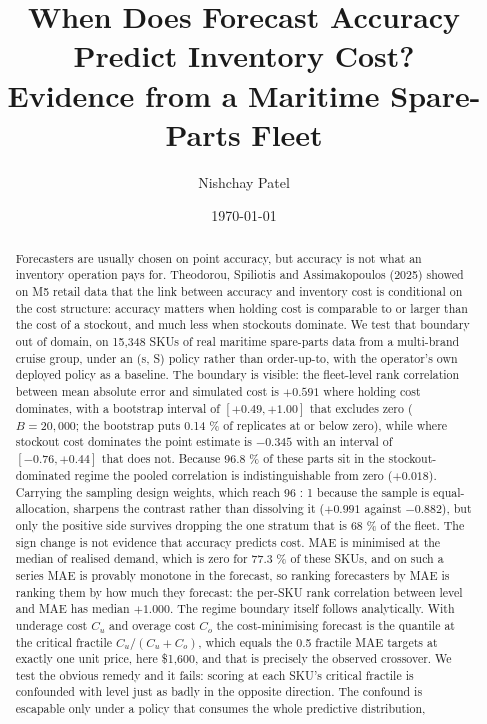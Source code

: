 \documentclass[11pt]{article}
\title{When Does Forecast Accuracy Predict Inventory Cost?\\[2pt]
\large Evidence from a Maritime Spare-Parts Fleet}
\author{Nishchay Patel}
\date{\today}
\begin{document}
\maketitle

\begin{abstract}
Forecasters are usually chosen on point accuracy, but accuracy is not what an
inventory operation pays for. Theodorou, Spiliotis and Assimakopoulos (2025)
showed on M5 retail data that the link between accuracy and inventory cost is
conditional on the cost structure: accuracy matters when holding cost is
comparable to or larger than the cost of a stockout, and much less when
stockouts dominate. We test that boundary out of domain, on 15{,}348 SKUs of
real maritime spare-parts data from a multi-brand cruise group, under an
(s, S) policy rather than order-up-to, with the operator's own deployed policy
as a baseline. The boundary is visible: the fleet-level rank correlation
between mean absolute error and simulated cost is $+0.591$ where holding cost
dominates, with a bootstrap interval of $[+0.49, +1.00]$ that excludes zero
($B = 20{,}000$; the bootstrap puts 0.14 \% of replicates at or below zero),
while where stockout cost dominates the point estimate is $-0.345$ with an
interval of $[-0.76, +0.44]$ that does not. Because 96.8 \% of these parts sit
in the stockout-dominated regime the pooled correlation is indistinguishable
from zero ($+0.018$). Carrying the sampling design weights, which reach 96 : 1
because the sample is equal-allocation, sharpens the contrast rather than
dissolving it ($+0.991$ against $-0.882$), but only the positive side survives
dropping the one stratum that is 68 \% of the fleet.
The sign change is not evidence that accuracy predicts cost. MAE is
minimised at the median of realised demand, which is zero for 77.3 \% of these
SKUs, and on such a series MAE is provably monotone in the forecast, so ranking
forecasters by MAE is ranking them by how much they forecast: the per-SKU rank
correlation between level and MAE has median $+1.000$. The regime boundary
itself follows analytically. With underage cost $C_u$ and overage cost $C_o$
the cost-minimising forecast is the quantile at the critical fractile
$C_u/(C_u+C_o)$, which equals the 0.5 fractile MAE targets at exactly one unit
price, here \$1{,}600, and that is precisely the observed crossover. We test
the obvious remedy and it fails: scoring at each SKU's critical fractile is
confounded with level just as badly in the opposite direction. The confound is
escapable only under a policy that consumes the whole predictive distribution,

\end{abstract}
\end{document}
